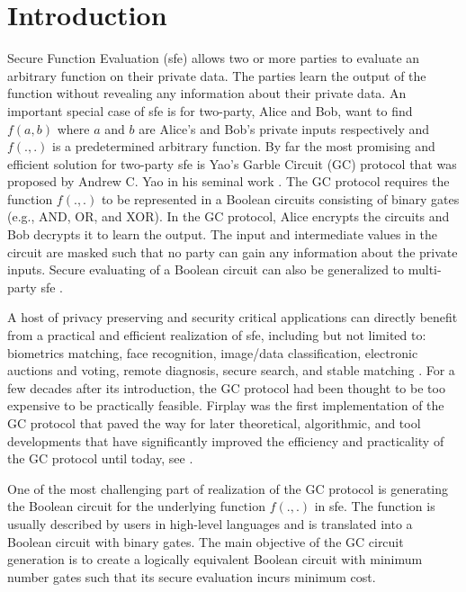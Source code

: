 \chapter{Introduction}
Secure Function Evaluation (\acrshort{sfe}) allows two or more parties to evaluate an arbitrary function on their private data.
The parties learn the output of the function without revealing any information about their private data.
An important special case of \acrshort{sfe} is for two-party, Alice and Bob, want to find $f(a, b)$ where $a$ and $b$ are Alice's and Bob's private inputs respectively and $f(., .)$ is a predetermined arbitrary function.
By far the most promising and efficient solution for two-party \acrshort{sfe} is Yao's Garble Circuit (GC) protocol that was proposed by Andrew C. Yao in his seminal work \cite{yao1986generate}.
The GC protocol requires the function $f(., .)$ to be represented in a Boolean circuits consisting of binary gates (e.g., AND, OR, and XOR).
In the GC protocol, Alice encrypts the circuits and Bob decrypts it to learn the output.
The input and intermediate values in the circuit are masked such that no party can gain any information about the private inputs.
Secure evaluating of a Boolean circuit can also be generalized to multi-party \acrshort{sfe} \cite{goldreich1987play, ben2008fairplaymp}.

A host of privacy preserving and security critical applications can directly benefit from a practical and efficient realization of \acrshort{sfe}, including but not limited to: biometrics matching, face recognition, image/data classification, electronic auctions and voting, remote diagnosis, secure search, and stable matching \cite{riazi2017toward, zhang2016robust, bringer2013privacy, evans2011efficient, barni2009secure, naor1999privacy, brickell2007privacy, jha2008towards}.
For a few decades after its introduction, the GC protocol had been thought to be too expensive to be practically feasible.
Firplay \cite{malkhi2004fairplay} was the first implementation of the GC protocol that paved the way for later theoretical, algorithmic, and tool developments that have significantly improved the efficiency and practicality of the GC protocol until today, see \cite{malkhi2004fairplay, kolesnikov2008improved, pinkas2009secure, huang2011faster, bellare2013efficient, zahur2015two, zahur2015obliv, liu2015oblivm}.

One of the most challenging part of realization of the GC protocol is generating the Boolean circuit for the underlying function $f(., .)$ in \acrshort{sfe}.
The function is usually described by users in high-level languages and is translated into a Boolean circuit with binary gates.
The main objective of the GC circuit generation is to create a logically equivalent Boolean circuit with minimum number gates such that its secure evaluation incurs minimum cost.

